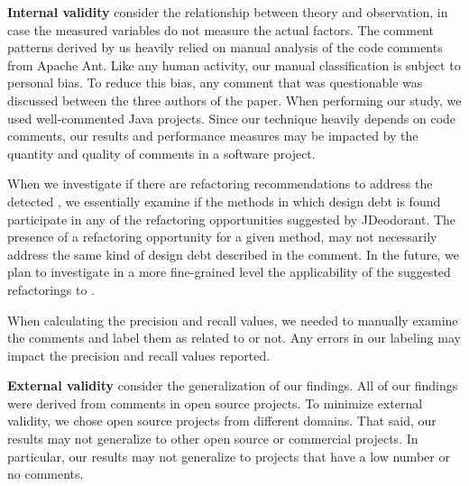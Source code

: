 \noindent\textbf{Internal validity} consider the relationship between theory and observation, in case the measured variables do not measure the actual factors. The comment patterns derived by us heavily relied on manual analysis of the code comments from Apache Ant. Like any human activity, our manual classification is subject to personal bias. To reduce this bias, any comment that was questionable was discussed between the three authors of the paper. When performing our study, we used well-commented Java projects. Since our technique heavily depends on code comments, our results and performance measures may be impacted by the quantity and quality of comments in a software project.  

When we investigate if there are refactoring recommendations to address the detected \SADTD, we essentially examine if the methods in which design debt is found participate in any of the refactoring opportunities suggested by JDeodorant.
The presence of a refactoring opportunity for a given method, may not necessarily address the same kind of design debt described in the comment. In the future, we plan to investigate in a more fine-grained level the applicability of the suggested refactorings to \SADTD.

When calculating the precision and recall values, we needed to manually examine the comments and label them as related to \SADTD or not. Any errors in our labeling may impact the precision and recall values reported.
 

\noindent \textbf{External validity} consider the generalization of our findings. All of our findings were derived from comments in open source projects. To minimize external validity, we chose open source projects from different domains. That said, our results may not generalize to other open source or commercial projects. In particular, our results may not generalize to projects that have a low number or no comments.
 
